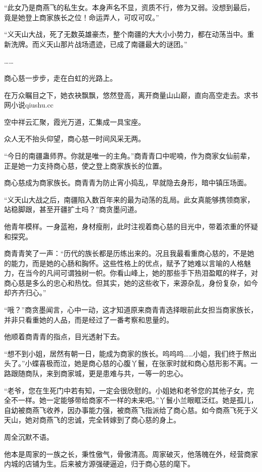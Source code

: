 \begin{this_body}
“此女乃是商燕飞的私生女。本身声名不显，资质不行，修为又弱。没想到最后，竟是她登上商家族长之位！命运弄人，可叹可叹。”

“义天山大战，死了无数英雄豪杰，整个南疆的大大小小势力，都在动荡当中。重新洗牌。而义天山那片战场遗迹，已成了南疆最大的谜团。”

……

商心慈一步步，走在白虹的光路上。

在万众瞩目之下，她衣袂飘飘，悠然登高，离开商量山山巅，直向高空走去。求书网小说qiushu.cc

空中祥云汇聚，霞光万道，汇集成一具宝座。

众人无不抬头仰望，商心慈一时间风采无两。

“今日的南疆蛊师界。你就是唯一的主角。”商青青口中呢喃，作为商家女仙前辈，正是她一力支持商心慈，使之登上商家族长的位置。

商心慈成为商家族长。商青青为防止宵小捣乱，早就隐去身形，暗中镇压场面。

“义天山大战之后，南疆陷入数百年来的最为动荡的乱局。此女真能够携领商家，站稳脚跟，甚至开疆扩土吗？”商贪墨问道。

他青年模样。一身蓝袍，身材瘦削，此时注视着商心慈的目光中，带着浓重的怀疑和探究。

商青青笑了一声：“历代的族长都是历练出来的。况且我最看重商心慈的，不是她的能力，而是她的心肠和胸怀。这些性格上的优点，赋予了她难以言喻的人格魅力，在当今的凡间可谓独树一帜。你看山峰上，她的那些手下热泪盈眶的样子，对商心慈是多么的忠心和热忱。但其实，她的这些收下，来源杂乱，身份复杂，如今却齐齐归心。”

“哦？”商贪墨闻言，心中一动，这才知道原来商青青选择眼前此女担当商家族长，并非只看重她的人品，而是经过了一番考察和思量的。

他顺着商青青的指点，目光透射下去。

“想不到小姐，居然有朝一日，能成为商家的族长。呜呜呜……小姐，我们终于熬出头了。”小蝶喜极而泣，她是商心慈的心腹丫鬟，在张家时就和商心慈形影不离。一路跟随商队，来到商家城，更是患难与共，一等一的忠心。

“老爷，您在生死门中若有知，一定会很欣慰的。小姐她和老爷您的其他子女，完全不一样。她一定能够带给商家不一样的未来吧。”丫鬟小兰眼眶泛红。她是孤儿，自幼被商燕飞收养，因办事能力强，被商燕飞指派给了商心慈。如今商燕飞死于义天山，她对商燕飞的忠诚，完全转嫁到了商心慈的身上。

周全沉默不语。

他本是周家的一族之长，秉性傲气，骨傲清高。周家破灭，他落魄在外，经营商家内城的店铺为生。后来被方源强硬逼迫，归于商心慈的麾下。


\end{this_body}
